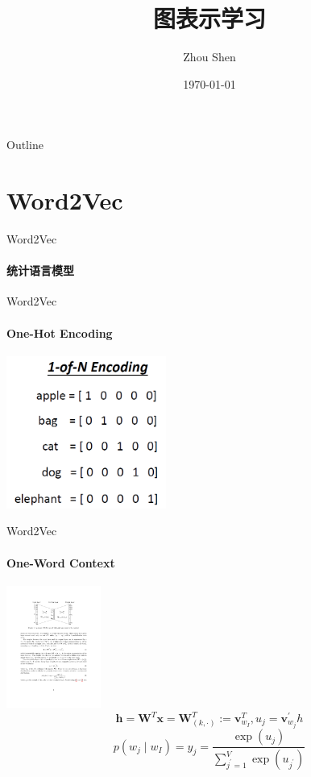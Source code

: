 \documentclass{beamer}
\title[Graph Embedding]{图表示学习}
\author[S. Zhou]{Zhou Shen}
\institute{School of Computer Science, Wuhan University}
\date{\today}
\begin{document}
\begin{frame}
    \titlepage
\end{frame}
\begin{frame}{Outline}
    \tableofcontents
\end{frame}
\section{Word2Vec}
\begin{frame}{Word2Vec}
    \framesubtitle{统计语言模型}
    
    
\end{frame}
\begin{frame}{Word2Vec}
    \framesubtitle{One-Hot Encoding}
    \centering\includegraphics[height=5cm]{one_hot.png}
\end{frame}
\begin{frame}{Word2Vec}
    \framesubtitle{One-Word Context}
    \centering\includegraphics[height=4cm]{word2vec_1.pdf}
    \begin{equation}
        \mathbf{h}=\mathbf{W}^{T} \mathbf{x}=\mathbf{W}_{(k, \cdot)}^{T}:=\mathbf{v}_{w_{I}}^{T}, u_j=\mathbf{v}_{w_j}^{\prime}h
    \end{equation}
    \begin{equation}
        p\left(w_{j} \mid w_{I}\right)=y_{j}=\frac{\exp \left(u_{j}\right)}{\sum_{j^{\prime}=1}^{V} \exp \left(u_{j^{\prime}}\right)}
    \end{equation}
\end{frame}
\end{document}
